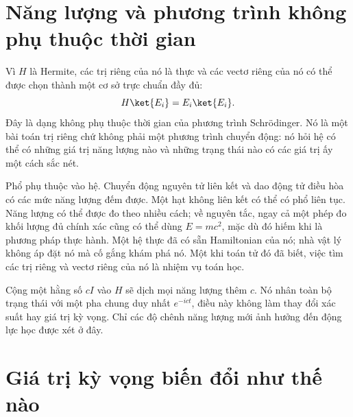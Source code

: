 \begin{classroomqa}
\end{classroomqa}

\section{Năng lượng và phương trình không phụ thuộc thời gian}

Vì \(H\) là Hermite, các trị riêng của nó là thực và các vectơ riêng của nó có thể được chọn thành một cơ sở trực chuẩn đầy đủ:
\begin{equation}
H\ket{E_i}=E_i\ket{E_i}.
\label{eq:l5-time-independent}
\end{equation}
Đây là dạng không phụ thuộc thời gian của phương trình Schr\"odinger. Nó là một bài toán trị riêng chứ không phải một phương trình chuyển động: nó hỏi hệ có thể có những giá trị năng lượng nào và những trạng thái nào có các giá trị ấy một cách sắc nét.

Phổ phụ thuộc vào hệ. Chuyển động nguyên tử liên kết và dao động tử điều hòa có các mức năng lượng đếm được. Một hạt không liên kết có thể có phổ liên tục. Năng lượng có thể được đo theo nhiều cách; về nguyên tắc, ngay cả một phép đo khối lượng đủ chính xác cũng có thể dùng \(E=mc^2\), mặc dù đó hiếm khi là phương pháp thực hành. Một hệ thực đã có sẵn Hamiltonian của nó; nhà vật lý không áp đặt nó mà cố gắng khám phá nó. Một khi toán tử đó đã biết, việc tìm các trị riêng và vectơ riêng của nó là nhiệm vụ toán học.

Cộng một hằng số \(cI\) vào \(H\) sẽ dịch mọi năng lượng thêm \(c\). Nó nhân toàn bộ trạng thái với một pha chung duy nhất \(e^{-ict}\), điều này không làm thay đổi xác suất hay giá trị kỳ vọng. Chỉ các độ chênh năng lượng mới ảnh hưởng đến động lực học được xét ở đây.

\section{Giá trị kỳ vọng biến đổi như thế nào}

